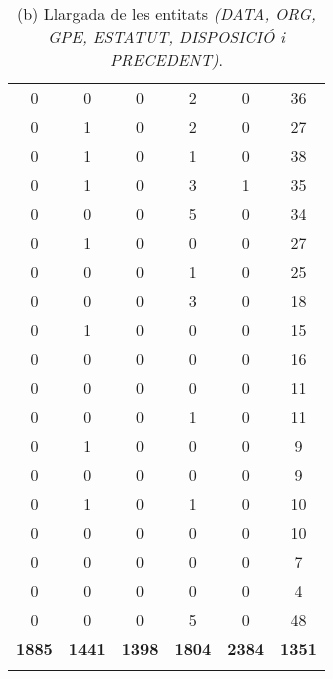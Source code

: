 \begin{table}[H]
\begin{tabular}{cccccc}
  0 & 0 & 0 & 2 & 0 & 36 \\ 
  0 & 1 & 0 & 2 & 0 & 27 \\ 
  0 & 1 & 0 & 1 & 0 & 38 \\ 
  0 & 1 & 0 & 3 & 1 & 35 \\ 
  0 & 0 & 0 & 5 & 0 & 34 \\ 
  0 & 1 & 0 & 0 & 0 & 27 \\ 
  0 & 0 & 0 & 1 & 0 & 25 \\ 
  0 & 0 & 0 & 3 & 0 & 18 \\ 
  0 & 1 & 0 & 0 & 0 & 15 \\ 
  0 & 0 & 0 & 0 & 0 & 16 \\ 
  0 & 0 & 0 & 0 & 0 & 11 \\ 
  0 & 0 & 0 & 1 & 0 & 11 \\ 
  0 & 1 & 0 & 0 & 0 & 9 \\ 
  0 & 0 & 0 & 0 & 0 & 9 \\ 
  0 & 1 & 0 & 1 & 0 & 10 \\ 
  0 & 0 & 0 & 0 & 0 & 10 \\ 
  0 & 0 & 0 & 0 & 0 & 7 \\ 
  0 & 0 & 0 & 0 & 0 & 4 \\ 
  0 & 0 & 0 & 5 & 0 & 48 \\ 
  \hline
  \textbf{1885} & \textbf{1441} & \textbf{1398} & \textbf{1804} & \textbf{2384} & \textbf{1351} \\
  \Xhline{2\arrayrulewidth}
  \end{tabular}
  \captionsetup{font=small}
  \caption*{(b) Llargada de les entitats \textit{(DATA, ORG, GPE, ESTATUT, DISPOSICIÓ i PRECEDENT)}.}
\end{table}
  


